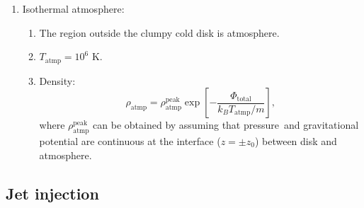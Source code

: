 \documentclass[twocolumn]{aastex631}
\begin{document}
\begin{enumerate}
\begin{enumerate}
    \item Pressure: $\displaystyle p_{\text{disk}}=\rho_{\text{disk}}T_{\text{disk}}$.

    \item The clumpy cuboid, using the publicly\
          available pyFC code\footnote{\url{https://pypi.python.org/pypi/pyFC}},\
          are described by a log-normal distribution with mean 1.0 and variance 5.0.\
          Also, the power spectrum of the clumpy cuboid is characterized by $k_{\text{min}}$ and $\beta$,\
          where $k_{\text{min}}$ sets the maximum cloud size within the clumpy cuboid,\
          and $\beta$ is the slope of power spectrum in Fourier space.
          In this paper, we set $\beta=-5/3$ and $k_{\text{min}}=375$ to follow the Kolmogorov spectrum\
          and to limits the maximum size of an individual cloud to approximately 25 pc.

    \item The clumpy disk is then constructed by multiplying a fractal cuboid with \Cref{disk-density}.

    \item The clouds and voids within clumpy disk are pressure balanced.
  \end{enumerate}


\item Isothermal atmosphere:
  \begin{enumerate}
     \item The region outside the clumpy cold disk is atmosphere.
     \item $T_{\text{atmp}}=10^{6}$ K. \citep{temperature-MW}
     \item Density:
          \begin{equation}
             \rho_{\text{atmp}}=\rho_{\text{atmp}}^{\text{peak}}
             \exp\left[-\frac{\Phi_{\text{total}}}{k_{B}T_{\text{atmp}}/m}\right],
             \label{atmosphere-density}
          \end{equation}
          where $\rho_{\text{atmp}}^{\text{peak}}$ can be obtained by assuming that pressure\
          and gravitational potential are continuous at the interface ($z=\pm z_{0}$) between disk and atmosphere.
  \end{enumerate}



\end{enumerate}
\subsection{Jet injection}
\end{document}
